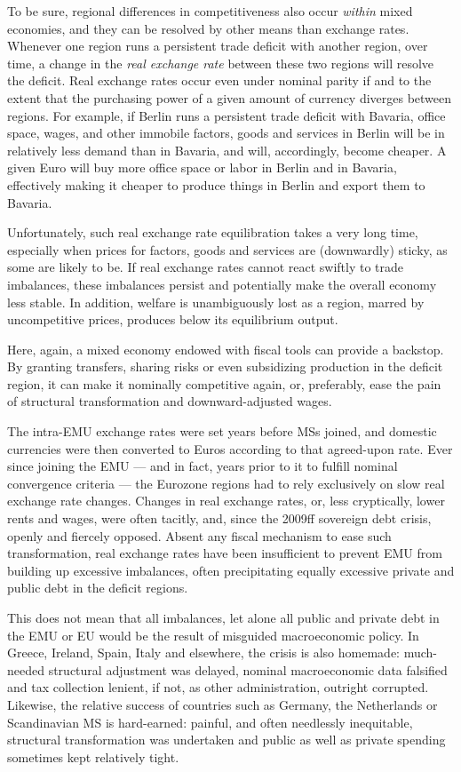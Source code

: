 \documentclass[11pt,a4paper,oneside]{article}
\begin{document}
To be sure, regional differences in competitiveness also occur \emph{within} mixed economies, and they can be resolved by other means than exchange rates.
Whenever one region runs a persistent trade deficit with another region, over time, a change in the \emph{real exchange rate} between these two regions will resolve the deficit.
Real exchange rates occur even under nominal parity if and to the extent that the purchasing power of a given amount of currency diverges between regions.
For example, if Berlin runs a persistent trade deficit with Bavaria, office space, wages, and other immobile factors, goods and services in Berlin will be in relatively less demand than in Bavaria, and will, accordingly, become cheaper.
A given Euro will buy more office space or labor in Berlin and in Bavaria, effectively making it cheaper to produce things in Berlin and export them to Bavaria.

Unfortunately, such real exchange rate equilibration takes a very long time, especially when prices for factors, goods and services are (downwardly) sticky, as some are likely to be.
If real exchange rates cannot react swiftly to trade imbalances, these imbalances persist and potentially make the overall economy less stable.
In addition, welfare is unambiguously lost as a region, marred by uncompetitive prices, produces below its equilibrium output.

Here, again, a mixed economy endowed with fiscal tools can provide a backstop.~
By granting transfers, sharing risks or even subsidizing production in the deficit region, it can make it nominally competitive again, or, preferably, ease the pain of structural transformation and downward-adjusted wages.

The intra-\gls{EMU} exchange rates were set years before \glspl{MS} joined, and domestic currencies were then converted to Euros according to that agreed-upon rate.
Ever since joining the \gls{EMU} --- and in fact, years prior to it to fulfill nominal convergence criteria --- the Eurozone regions had to rely exclusively on slow real exchange rate changes.
Changes in real exchange rates, or, less cryptically, lower rents and wages, were often tacitly, and, since the 2009ff sovereign debt crisis, openly and fiercely opposed.
Absent any fiscal mechanism to ease such transformation, real exchange rates have been insufficient to prevent \gls{EMU} from building up excessive imbalances, often precipitating equally excessive private and public debt in the deficit regions.

This does not mean that all imbalances, let alone all public and private debt in the \gls{EMU} or \gls{EU} would be the result of misguided macroeconomic policy.
In Greece, Ireland, Spain, Italy and elsewhere, the crisis is also homemade:
much-needed structural adjustment was delayed, nominal macroeconomic data falsified and tax collection lenient, if not, as other administration, outright corrupted.
Likewise, the relative success of countries such as Germany, the Netherlands or Scandinavian \gls{MS} is hard-earned:
painful, and often needlessly inequitable, structural transformation was undertaken and public as well as private spending sometimes kept relatively tight.
\end{document}
